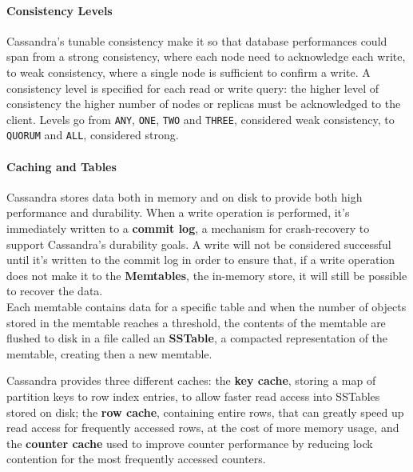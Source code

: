 \paragraph{Consistency Levels} Cassandra's tunable consistency make it so that database performances could span from a strong consistency, where each node need to acknowledge each write, to weak consistency, where a single node is sufficient to confirm a write. A consistency level is specified for each read or write query: the higher level of consistency the higher number of nodes or replicas must be acknowledged to the client. Levels go from \texttt{ANY}, \texttt{ONE}, \texttt{TWO} and \texttt{THREE}, considered weak consistency, to \texttt{QUORUM} and \texttt{ALL}, considered strong.

\paragraph{Caching and Tables} Cassandra stores data both in memory and on disk to provide both high performance and durability. When a write operation is performed, it’s immediately written to a \textbf{commit log}, a mechanism for crash-recovery to support Cassandra’s durability goals. A write will not be considered successful until it’s written to the commit log in order to ensure that, if a write operation does not make it to  the \textbf{Memtables}, the in-memory store, it will still be possible to recover the data. 
\\Each memtable contains data for a specific table and when the number of objects stored in the memtable reaches a threshold, the contents of the memtable are flushed to disk in a file called an \textbf{SSTable}, a compacted representation of the memtable, creating then a new memtable.

Cassandra provides three different caches: the \textbf{key cache}, storing a map of partition keys to row index entries, to allow faster read access into SSTables stored on disk; the \textbf{row cache}, containing entire rows, that can greatly speed up read access for frequently accessed rows, at the cost of more memory usage, and the \textbf{counter cache} used to improve counter performance by reducing lock contention for the most frequently accessed counters.

